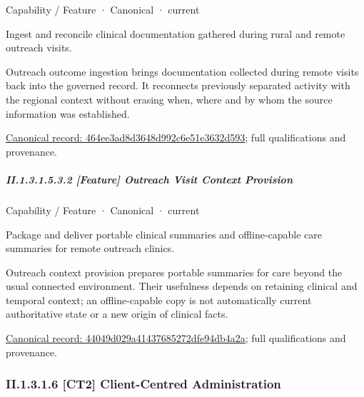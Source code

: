 \label{element:464ee3ad8d3648d992c6e51e3632d593}
{\small Capability / Feature · Canonical · current}\par

Ingest and reconcile clinical documentation gathered during rural and remote outreach visits.



Outreach outcome ingestion brings documentation collected during remote visits back into the governed record. It reconnects previously separated activity with the regional context without erasing when, where and by whom the source information was established.


{\footnotesize \href{../../../../../../../continuum/strategy/capability/feature/464ee3ad8d3648d992c6e51e3632d593.md}{Canonical record: 464ee3ad8d3648d992c6e51e3632d593}; full qualifications and provenance.}\par
\subparagraph*{II.1.3.1.5.3.2 [Feature] Outreach Visit Context Provision}
\label{navigation:II.1.3.1.5.3.2}

\label{element:44049d029a41437685272dfe94db4a2a}
{\small Capability / Feature · Canonical · current}\par

Package and deliver portable clinical summaries and offline-capable care summaries for remote outreach clinics.



Outreach context provision prepares portable summaries for care beyond the usual connected environment. Their usefulness depends on retaining clinical and temporal context; an offline-capable copy is not automatically current authoritative state or a new origin of clinical facts.


{\footnotesize \href{../../../../../../../continuum/strategy/capability/feature/44049d029a41437685272dfe94db4a2a.md}{Canonical record: 44049d029a41437685272dfe94db4a2a}; full qualifications and provenance.}\par
\subsubsection*{II.1.3.1.6 [CT2] Client-Centred Administration}
\label{navigation:II.1.3.1.6}

